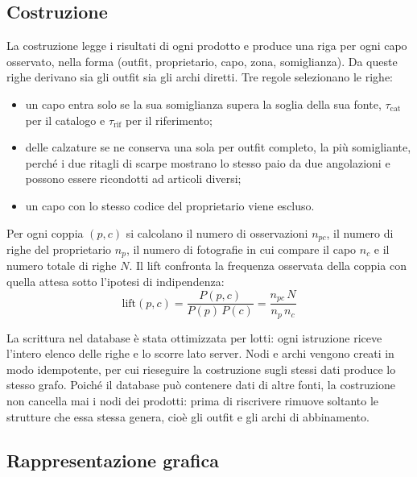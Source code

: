 \newpage

\subsection{Costruzione}

La costruzione legge i risultati di ogni prodotto e produce una riga per ogni capo osservato, nella forma (outfit, proprietario, capo, zona, somiglianza). Da queste righe derivano sia gli outfit sia gli archi diretti. Tre regole selezionano le righe:
\begin{itemize}
  \item un capo entra solo se la sua somiglianza supera la soglia della sua fonte, $\tau_{\mathrm{cat}}$ per il catalogo e $\tau_{\mathrm{rif}}$ per il riferimento;
  \item delle calzature se ne conserva una sola per outfit completo, la più somigliante, perché i due ritagli di scarpe mostrano lo stesso paio da due angolazioni e possono essere ricondotti ad articoli diversi;
  \item un capo con lo stesso codice del proprietario viene escluso.
\end{itemize}

\noindent
Per ogni coppia $(p, c)$ si calcolano il numero di osservazioni $n_{pc}$, il numero di righe del proprietario $n_p$, il numero di fotografie in cui compare il capo $n_c$ e il numero totale di righe $N$. Il lift confronta la frequenza osservata della coppia con quella attesa sotto l'ipotesi di indipendenza:
\begin{equation}\label{eq:pip-lift}
  \mathrm{lift}(p, c) = \frac{P(p, c)}{P(p)\,P(c)} = \frac{n_{pc}\,N}{n_p\,n_c}
\end{equation}

\noindent
La scrittura nel database è stata ottimizzata per lotti: ogni istruzione riceve l'intero elenco delle righe e lo scorre lato server. Nodi e archi vengono creati in modo idempotente, per cui rieseguire la costruzione sugli stessi dati produce lo stesso grafo. Poiché il database può contenere dati di altre fonti, la costruzione non cancella mai i nodi dei prodotti: prima di riscrivere rimuove soltanto le strutture che essa stessa genera, cioè gli outfit e gli archi di abbinamento.

\newpage

\subsection{Rappresentazione grafica}

